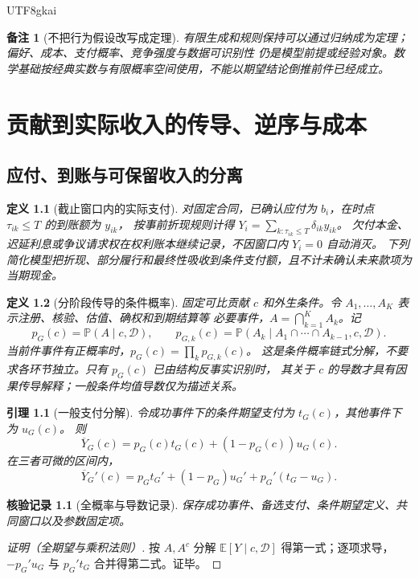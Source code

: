 \documentclass[12pt,a4paper,openany]{report}
\newtheorem{definition}{定义}[chapter]
\newtheorem{lemma}{引理}[chapter]
\newtheorem{remark}{备注}[chapter]
\newtheorem{Certificate}{核验记录}[chapter]
\newcommand{\EE}{\mathbb E}
\newcommand{\PP}{\mathbb P}
\begin{document}
\begin{CJK*}{UTF8}{gkai}
\begin{remark}[不把行为假设改写成定理]
有限生成和规则保持可以通过归纳成为定理；偏好、成本、支付概率、竞争强度与数据可识别性
仍是模型前提或经验对象。数学基础按经典实数与有限概率空间使用，不能以期望结论倒推前件已经成立。
\end{remark}

\chapter{贡献到实际收入的传导、逆序与成本}
\label{chap:transmission}

\section{应付、到账与可保留收入的分离}

\begin{definition}[截止窗口内的实际支付]
\label{def:cash}
对固定合同，已确认应付为 $b_i$，在时点 $\tau_{ik}\le T$ 的到账额为 $y_{ik}$，
按事前折现规则计得 $Y_i=\sum_{k:\tau_{ik}\le T}\delta_{ik}y_{ik}$。
欠付本金、迟延利息或争议请求权在权利账本继续记录，不因窗口内 $Y_i=0$ 自动消灭。
下列简化模型把折现、部分履行和最终性吸收到条件支付额，且不计未确认未来款项为当期现金。
\end{definition}

\begin{definition}[分阶段传导的条件概率]
\label{def:pipeline}
固定可比贡献 $c$ 和外生条件。令 $A_1,\ldots,A_K$ 表示注册、核验、估值、确权和到期结算等
必要事件，$A=\bigcap_{k=1}^K A_k$。记
\[
 p_G(c)=\PP(A\mid c,\mathcal D),\qquad
 p_{G,k}(c)=\PP(A_k\mid A_1\cap\cdots\cap A_{k-1},c,\mathcal D).
\]
当前件事件有正概率时，$p_G(c)=\prod_kp_{G,k}(c)$。
这是条件概率链式分解，不要求各环节独立。只有 $p_G(c)$ 已由结构反事实识别时，
其关于 $c$ 的导数才具有因果传导解释；一般条件均值导数仅为描述关系。
\end{definition}

\begin{lemma}[一般支付分解]
\label{lem:payment-decomposition}
令成功事件下的条件期望支付为 $t_G(c)$，其他事件下为 $u_G(c)$。
则
\[
 \overline Y_G(c)=p_G(c)t_G(c)+(1-p_G(c))u_G(c).
\]
在三者可微的区间内，
\begin{equation}\label{eq:payment-derivative}
 \overline Y_G'(c)=p_Gt_G'+(1-p_G)u_G'+p_G'(t_G-u_G).
\end{equation}
\end{lemma}
\begin{Certificate}[全概率与导数记录]
保存成功事件、备选支付、条件期望定义、共同窗口以及参数固定项。
\end{Certificate}
\begin{proof}[证明（全期望与乘积法则）]
按 $A,A^c$ 分解 $\EE[Y\mid c,\mathcal D]$ 得第一式；逐项求导，
$-p_G'u_G$ 与 $p_G't_G$ 合并得第二式。证毕。
\end{proof}


\end{CJK*}
\end{document}
